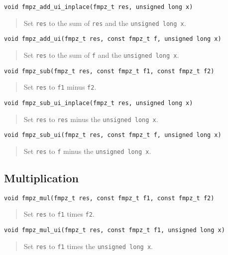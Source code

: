 \documentclass[a4paper,10pt]{article}
\newcommand{\code}{\lstinline}
\begin{document}
\begin{lstlisting}
void fmpz_add_ui_inplace(fmpz_t res, unsigned long x)
\end{lstlisting}
\begin{quote}
Set \code{res} to the sum of \code{res} and the \code{unsigned long x}.
\end{quote}

\begin{lstlisting}
void fmpz_add_ui(fmpz_t res, const fmpz_t f, unsigned long x)
\end{lstlisting}
\begin{quote}
Set \code{res} to the sum of \code{f} and the \code{unsigned long x}.
\end{quote}

\begin{lstlisting}
void fmpz_sub(fmpz_t res, const fmpz_t f1, const fmpz_t f2)
\end{lstlisting}
\begin{quote}
Set \code{res} to \code{f1} minus \code{f2}.
\end{quote}

\begin{lstlisting}
void fmpz_sub_ui_inplace(fmpz_t res, unsigned long x)
\end{lstlisting}
\begin{quote}
Set \code{res} to \code{res} minus the \code{unsigned long x}.
\end{quote}

\begin{lstlisting}
void fmpz_sub_ui(fmpz_t res, const fmpz_t f, unsigned long x)
\end{lstlisting}
\begin{quote}
Set \code{res} to \code{f} minus the \code{unsigned long x}.
\end{quote}

\subsection{Multiplication}

\begin{lstlisting}
void fmpz_mul(fmpz_t res, const fmpz_t f1, const fmpz_t f2)
\end{lstlisting}
\begin{quote}
Set \code{res} to \code{f1} times \code{f2}.
\end{quote}

\begin{lstlisting}
void fmpz_mul_ui(fmpz_t res, const fmpz_t f1, unsigned long x)
\end{lstlisting}
\begin{quote}
Set \code{res} to \code{f1} times the \code{unsigned long x}.
\end{quote}
\end{document}
